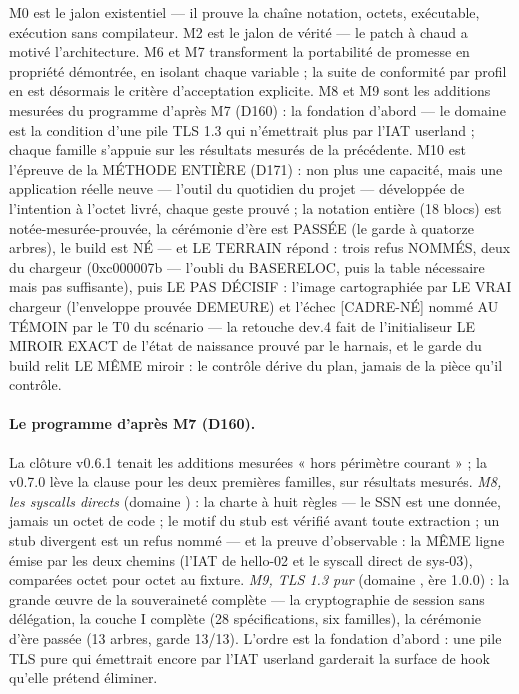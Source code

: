 M0 est le jalon existentiel — il prouve la chaîne notation, octets, exécutable, exécution
sans compilateur. M2 est le jalon de vérité — le patch à chaud a motivé l'architecture.
M6 et M7 transforment la portabilité de promesse en propriété démontrée, en isolant chaque
variable ; la suite de conformité par profil en est désormais le critère d'acceptation
explicite. M8 et M9 sont les additions mesurées du programme d'après M7 (D160) : la
fondation d'abord — le domaine  est la condition d'une pile TLS 1.3 qui
n'émettrait plus par l'IAT userland ; chaque famille s'appuie sur les résultats
mesurés de la précédente. M10 est l'épreuve de la MÉTHODE ENTIÈRE (D171) : non plus
une capacité, mais une application réelle neuve — l'outil du quotidien du projet —
développée de l'intention à l'octet livré, chaque geste prouvé ; la notation entière
(18 blocs) est notée-mesurée-prouvée, la cérémonie d'ère est PASSÉE (le garde à
quatorze arbres), le build est NÉ — et LE TERRAIN répond : trois refus NOMMÉS,
deux du chargeur (0xc000007b — l'oubli du BASERELOC, puis la table nécessaire
mais pas suffisante), puis LE PAS DÉCISIF : l'image cartographiée par LE VRAI
chargeur (l'enveloppe prouvée DEMEURE) et l'échec [CADRE-NÉ] nommé AU TÉMOIN
par le T0 du scénario — la retouche dev.4 fait de l'initialiseur  LE
MIROIR EXACT de l'état de naissance prouvé par le harnais, et le garde du build
relit LE MÊME miroir : le contrôle dérive du plan, jamais de la pièce qu'il
contrôle.

\paragraph{Le programme d'après M7 (D160).} La clôture v0.6.1 tenait les additions
mesurées « hors périmètre courant » ; la v0.7.0 lève la clause pour les deux
premières familles, sur résultats mesurés. \emph{M8, les syscalls directs} (domaine
) : la charte à huit règles — le SSN est une donnée, jamais un octet de
code ; le motif du stub est vérifié avant toute extraction ; un stub divergent est
un refus nommé — et la preuve d'observable : la MÊME ligne émise par les deux
chemins (l'IAT  de hello-02 et le syscall direct 
de sys-03), comparées octet pour octet au fixture. \emph{M9, TLS 1.3 pur} (domaine
, ère 1.0.0) : la grande œuvre de la souveraineté complète — la
cryptographie de session sans délégation, la couche I complète (28 spécifications,
six familles), la cérémonie d'ère passée (13 arbres, garde 13/13). L'ordre est la
fondation d'abord : une pile TLS pure qui émettrait encore par l'IAT userland
garderait la surface de hook qu'elle prétend éliminer.

